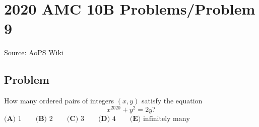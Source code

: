 \documentclass[12pt]{article}
\begin{document}
\section*{{2020 AMC 10B Problems/Problem 9}}
Source: AoPS Wiki

\subsection*{Problem}
How many ordered pairs of integers $(x, y)$ satisfy the equation \[x^{2020}+y^2=2y?\] $\textbf{(A) } 1 \qquad\textbf{(B) } 2 \qquad\textbf{(C) } 3 \qquad\textbf{(D) } 4 \qquad\textbf{(E) } \text{infinitely many}$
\end{document}

